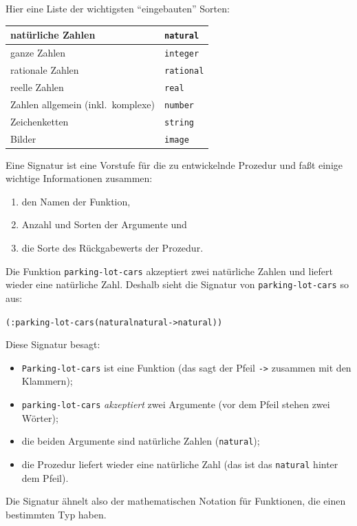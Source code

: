 Hier eine Liste der wichtigsten "`eingebauten"' Sorten:
%
\begin{center}
  \begin{tabular}{l|l}
    natürliche Zahlen & \texttt{natural}\\\hline
    ganze Zahlen & \texttt{integer}\\\hline
    rationale Zahlen & \texttt{rational}\\\hline
    reelle Zahlen & \texttt{real}\\\hline
    Zahlen allgemein (inkl.\ komplexe) & \texttt{number}\\\hline
    Zeichenketten & \texttt{string}\\\hline
    Bilder & \texttt{image}
  \end{tabular}
\end{center}
%
Eine Signatur
ist eine Vorstufe für die zu entwickelnde Prozedur und faßt einige
wichtige Informationen zusammen:
%
\begin{enumerate}
\item den Namen der Funktion,
\item Anzahl und Sorten der Argumente und
\item die Sorte des Rückgabewerts der Prozedur.
\end{enumerate}
%
Die Funktion
\texttt{parking-lot-cars} akzeptiert zwei natürliche Zahlen und
liefert wieder eine natürliche Zahl.  Deshalb sieht die Signatur von
\texttt{parking-lot-cars} so aus:
%
\begin{alltt}
(: parking-lot-cars (natural natural -> natural))
\end{alltt}
%
Diese Signatur besagt:
%
\begin{itemize}
\item \texttt{Parking-lot-cars} ist eine Funktion (das sagt der Pfeil
  \verb|->| zusammen mit den Klammern);
\item \texttt{parking-lot-cars}
  \textit{akzeptiert} zwei Argumente (vor dem Pfeil
stehen zwei Wörter);
\item die beiden Argumente sind natürliche Zahlen (\texttt{natural});
\item die Prozedur liefert wieder eine natürliche Zahl (das ist
das \texttt{natural} hinter dem Pfeil).
\end{itemize}
%
Die Signatur ähnelt also der mathematischen Notation für Funktionen,
die einen bestimmten Typ haben.

